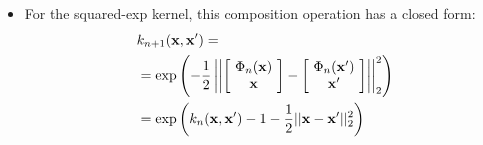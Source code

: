 \documentclass[portrait,a0b,final,a4resizeable]{include/a0poster}
\begin{document}
\begin{poster}
\begin{multicols}{2}
\begin{minipage}[c]{0.6\columnwidth}
\begin{itemize}
\item For the squared-exp kernel, this composition operation has a closed form:%
%
%
%
%
%
\begin{align*}
& k_{n+1}({\bf{x}}, {\bf{x}}') = \nonumber \\
& = \exp \left( -\frac{1}{2} \left|\left| \left[ \! \begin{array}{c} \Phi_n({\bf{x}}) \\ {\bf{x}} \end{array} \! \right]  - \left[ \! \begin{array}{c} \Phi_n({\bf{x}}') \\ {\bf{x}}' \end{array} \! \right] \right| \right|_2^2 \right) \nonumber \\
& = \exp \left( k_n({\bf{x}}, {\bf{x}}') - 1 -\frac{1}{2} || {\bf{x}} - {\bf{x}}' ||_2^2 \right)
\end{align*}


\end{itemize}
\end{minipage}
\end{multicols}
\end{poster}
\end{document}
